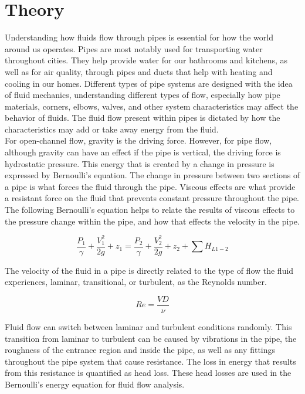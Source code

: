 \documentclass{article}
\begin{document}
\section{Theory}
\noindent Understanding how fluids flow through pipes is essential for how the world around us operates. Pipes are most notably used for transporting water throughout cities. They help provide water for our bathrooms and kitchens, as well as for air quality, through pipes and ducts that help with heating and cooling in our homes. Different types of pipe systems are designed with the idea of fluid mechanics, understanding different types of flow, especially how pipe materials, corners, elbows, valves, and other system characteristics may affect the behavior of fluids. The fluid flow present within pipes is dictated by how the characteristics may add or take away energy from the fluid.\\

\noindent For open-channel flow, gravity is the driving force. However, for pipe flow, although gravity can have an effect if the pipe is vertical, the driving force is hydrostatic pressure. This energy that is created by a change in pressure is expressed by Bernoulli's equation. The change in pressure between two sections of a pipe is what forces the fluid through the pipe. Viscous effects are what provide a resistant force on the fluid that prevents constant pressure throughout the pipe. The following Bernoulli's equation helps to relate the results of viscous effects to the pressure change within the pipe, and how that effects the velocity in the pipe.

\[\frac{P_1}{\gamma}+\frac{V_1^2}{2g}+z_1=\frac{P_2}{\gamma}+\frac{V_2^2}{2g}+z_2+\sum H_{L1-2}\]

\noindent The velocity of the fluid in a pipe is directly related to the type of flow the fluid experiences, laminar, transitional, or turbulent, as the Reynolds number.

\[Re=\frac{VD}{\nu}\]

\noindent Fluid flow can switch between laminar and turbulent conditions randomly. This transition from laminar to turbulent can be caused by vibrations in the pipe, the roughness of the entrance region and inside the pipe, as well as any fittings throughout the pipe system that cause resistance. The loss in energy that results from this resistance is quantified as head loss. These head losses are used in the Bernoulli's energy equation for fluid flow analysis. \\
\end{document}
